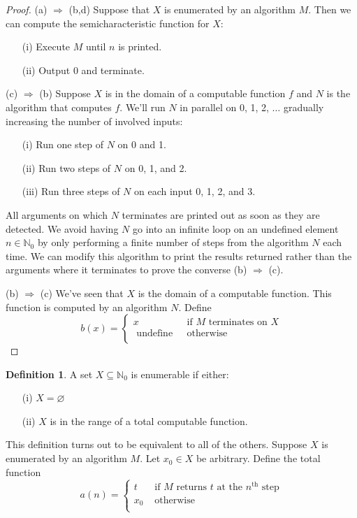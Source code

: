 \documentclass[10pt, letterpaper]{article}
\newcommand{\N}{\mathbb{N}}
\theoremstyle{remark}
\theoremstyle{definition}
\newtheorem{defn}{Definition}
\begin{document}
\begin{proof}
	(a) $\Rightarrow$ (b,d) Suppose that $X$ is enumerated by an algorithm $M$. Then we can compute the semicharacteristic function for $X$:
		\begin{enumerate}
			\item[(i)] Execute $M$ until $n$ is printed.
			\item[(ii)] Output 0 and terminate.
		\end{enumerate}
		
	(c) $\Rightarrow$ (b) Suppose $X$ is in the domain of a computable function $f$ and $N$ is the algorithm that computes $f$. We'll run $N$ in parallel on 0, 1, 2, $\ldots$ gradually increasing the number of involved inputs:
		\begin{enumerate}
			\item[(i)] Run one step of $N$ on 0 and 1.
			\item[(ii)] Run two steps of $N$ on 0, 1, and 2.
			\item[(iii)] Run three steps of $N$ on each input 0, 1, 2, and 3.
		\end{enumerate}
		All arguments on which $N$ terminates are printed out as soon as they are detected. We avoid having $N$ go into an infinite loop on an undefined element $n \in \N_0$ by only performing a finite number of steps from the algorithm $N$ each time. We can modify this algorithm to print the results returned rather than the arguments where it terminates to prove the converse (b) $\Rightarrow$ (c).

(b) $\Rightarrow$ (c) We've seen that $X$ is the domain of a computable function. This function is computed by an algorithm $N$. Define
\[
	b(x) = \begin{cases}
		x &\text{ if } M \text{ terminates on } X \\
		\text{ undefine } & \text{ otherwise } \\
	\end{cases}
\]
\end{proof}

\begin{defn}
	A set $X \subseteq \N_0$ is enumerable if either:
	\begin{enumerate}
		\item[(i)] $X = \varnothing$
		\item[(ii)] $X$ is in the range of a total computable function.
	\end{enumerate}
\end{defn}

This definition turns out to be equivalent to all of the others. Suppose $X$ is enumerated by an algorithm $M$. Let $x_0 \in X$ be arbitrary. Define the total function
\[
	a(n) = \begin{cases}
		t & \text{ if } M \text{ returns $t$ at the $n^{\text{th}}$ step} \\
		x_0 & \text{ otherwise } \\
	\end{cases}
\]
\end{document}

